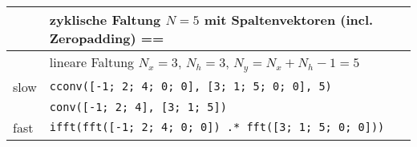 \begin{table}[h]
\centering
\begin{tabular}{| l | l | l |}
\hline
& zyklische Faltung $N=5$ mit Spaltenvektoren (incl. Zeropadding) ==\\\hline
& lineare Faltung $N_x=3$, $N_h=3$, $N_y = N_x+N_h-1=5$ \\\hline
slow & \texttt{cconv([-1; 2; 4; 0; 0], [3; 1; 5; 0; 0], 5)} \\\hline
& \texttt{conv([-1; 2; 4], [3; 1; 5])} \\\hline
fast & \texttt{ifft(fft([-1; 2; 4; 0; 0]) .* fft([3; 1; 5; 0; 0]))} \\\hline
\end{tabular}
\end{table}



